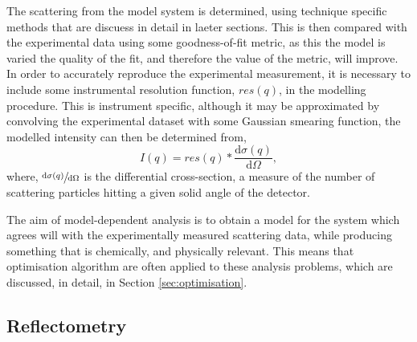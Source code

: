 The scattering from the model system is determined, using technique specific methods that are discuess in detail in laeter sections.
This is then compared with the experimental data using some goodness-of-fit metric, as this the model is varied the quality of the fit, and therefore the value of the metric, will improve.
In order to accurately reproduce the experimental measurement, it is necessary to include some instrumental resolution function, $res(q)$, in the modelling procedure.
This is instrument specific, although it may be approximated by convolving the experimental dataset with some Gaussian smearing function, the modelled intensity can then be determined from,
%
\begin{equation}
	I(q) = res(q) * \frac{\text{d}\sigma(q)}{\text{d}\Omega},
\end{equation}
%
where, $\sfrac{\text{d}\sigma(q)}{\text{d}\Omega}$ is the differential cross-section, a measure of the number of scattering particles hitting a given solid angle of the detector.

The aim of model-dependent analysis is to obtain a model for the system which agrees will with the experimentally measured scattering data, while producing something that is chemically, and physically relevant.
This means that optimisation algorithm are often applied to these analysis problems, which are discussed, in detail, in Section \ref{sec:optimisation}.

\subsection{Reflectometry}

